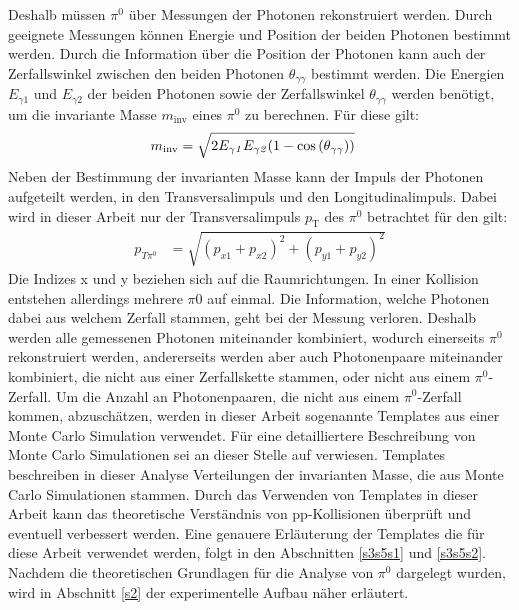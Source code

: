 Deshalb müssen $\pi^{0}$ über Messungen der Photonen rekonstruiert werden.
Durch geeignete Messungen können Energie und Position der beiden Photonen bestimmt werden.
Durch die Information über die Position der Photonen kann auch der Zerfallswinkel zwischen den beiden Photonen $\theta_{\gamma\gamma}$ bestimmt werden.
Die Energien $E_{\gamma1}$ und $E_{\gamma2}$ der beiden Photonen sowie der Zerfallswinkel $\theta_{\gamma\gamma}$ werden benötigt, um die invariante Masse $m_{\text{inv}}$ eines $\pi^{0}$ zu berechnen.
Für diese gilt:
\begin{align}
m_{\text{inv}} &= \sqrt{2E_{\gamma\it{1}}E_{\gamma\it{2}}(1-\cos\left( \theta_{\gamma\gamma}\right) )} \label{eq_invmass}
\end{align}
\newline
Neben der Bestimmung der invarianten Masse kann der Impuls der Photonen aufgeteilt werden, in den Transversalimpuls und den Longitudinalimpuls.
Dabei wird in dieser Arbeit nur der Transversalimpuls $p_\text{T}$ des $\pi^{0}$ betrachtet für den gilt:
\begin{align}
p_{T\pi^{0}} &= \sqrt{\left(p_{x1}+p_{x2}\right)^{2} +\left(p_{y1}+p_{y2}\right)^{2}} \label{eq_pt}
\end{align}
Die Indizes x und y beziehen sich auf die Raumrichtungen.
\newline
In einer Kollision entstehen allerdings mehrere $\pi{0}$ auf einmal.
Die Information, welche Photonen dabei aus welchem Zerfall stammen, geht bei der Messung verloren.
Deshalb werden alle gemessenen Photonen miteinander kombiniert, wodurch einerseits $\pi^{0}$ rekonstruiert werden, andererseits werden aber auch Photonenpaare miteinander kombiniert, die nicht aus einer Zerfallskette stammen, oder nicht aus einem $\pi^{0}$-Zerfall.
Um die Anzahl an Photonenpaaren, die nicht aus einem $\pi^{0}$-Zerfall kommen, abzuschätzen, werden in dieser Arbeit sogenannte Templates aus einer Monte Carlo Simulation verwendet.
Für eine detailliertere Beschreibung von Monte Carlo Simulationen sei an dieser Stelle auf \cite{thesis:Krissy} verwiesen.
Templates beschreiben in dieser Analyse Verteilungen der invarianten Masse, die aus Monte Carlo Simulationen stammen.
Durch das Verwenden von Templates in dieser Arbeit kann das theoretische Verständnis von pp-Kollisionen überprüft und eventuell verbessert werden.
Eine genauere Erläuterung der Templates die für diese Arbeit verwendet werden, folgt in den Abschnitten \ref{s3s5s1} und \ref{s3s5s2}.
\newline
Nachdem die theoretischen Grundlagen für die Analyse von $\pi^{0}$ dargelegt wurden, wird in Abschnitt \ref{s2} der experimentelle Aufbau näher erläutert.